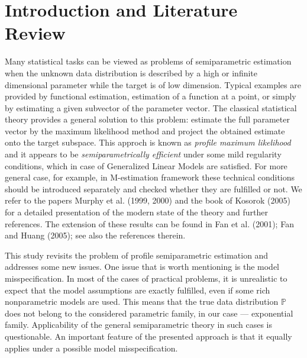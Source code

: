 \section{Introduction and Literature Review}

\par Many statistical tasks can be viewed as problems of semiparametric estimation when the unknown data distribution is described by a high or infinite dimensional parameter while the target is of low dimension. Typical examples are provided by functional estimation, estimation of a function at a point, or simply by estimating a given subvector of the parameter vector. The classical statistical theory provides a general solution to this problem: estimate the full parameter vector by the maximum likelihood method and project the obtained estimate onto the target subspace. This approch is known as {\it{profile maximum likelihood}} and it appears to be {\it{semiparametrically efficient}} under some mild regularity conditions, which in case of Generalized Linear Models are satisfied. For more general case, for example, in M-estimation framework these technical conditions should be introduced separately and checked whether they are fulfilled or not.  We refer to the papers Murphy et al. (1999, 2000) and the book of Kosorok (2005) for a detailed presentation of the modern state of the theory and further references. The extension of these results can be found in Fan et al. (2001); Fan and Huang (2005); see also the references therein. 

This study revisits the problem of profile semiparametric estimation and addresses some new issues. One issue that is worth mentioning is the model misspecification. In most of the cases of practical problems, it is unrealistic to expect that the model assumptions are exactly fulfilled, even if some rich nonparametric models are used. This means that the true data distribution $\mathbb{P}$ does not belong to the considered parametric family, in our case --- exponential family. Applicability of the general semiparametric theory in such cases is questionable. An important feature of the presented approach is that it equally applies under a possible model misspecification. 

